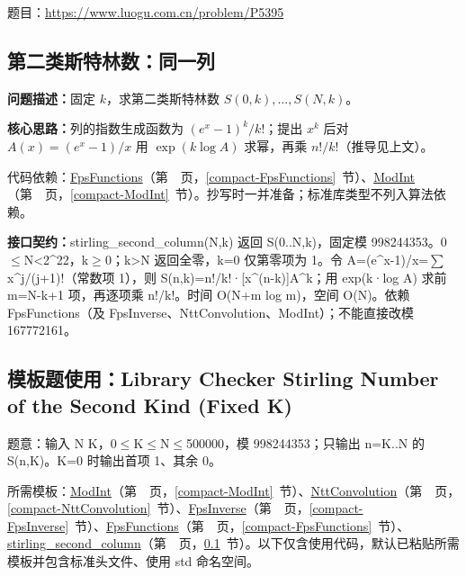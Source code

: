 题目：\url{https://www.luogu.com.cn/problem/P5395}



\Needspace{503pt}

\subsection{第二类斯特林数：同一列}\label{compact-stirling_second_column}

\noindent\textbf{问题描述：}\allowbreak 固定 $k$，求第二类斯特林数 $S(0,k),\dots,S(N,k)$。

\textbf{核心思路：}\allowbreak 列的指数生成函数为 $(e^x-1)^k/k!$；提出 $x^k$ 后对 $A(x)=(e^x-1)/x$ 用 $\exp(k\log A)$ 求幂，再乘 $n!/k!$（推导见上文）。

代码依赖：\hyperref[compact-FpsFunctions]{FpsFunctions}（第~\pageref{compact-FpsFunctions}~页，\ref{compact-FpsFunctions}~节）、\hyperref[compact-ModInt]{ModInt}（第~\pageref{compact-ModInt}~页，\ref{compact-ModInt}~节）。抄写时一并准备；标准库类型不列入算法依赖。

{\sloppy{}\noindent\textbf{接口契约：}stirling\_second\_column(N,k) 返回 S(0..N,k)，固定模 998244353。0$\le$N<2\textasciicircum{}22，k$\ge$0；k>N 返回全零，k=0 仅第零项为 1。令 A=(e\textasciicircum{}x-1)/x=$\sum$x\textasciicircum{}j/(j+1)!（常数项 1），则 S(n,k)=n!/k!·[x\textasciicircum{}(n-k)]A\textasciicircum{}k；用 exp(k·log A) 求前 m=N-k+1 项，再逐项乘 n!/k!。时间 O(N+m log m)，空间 O(N)。依赖 FpsFunctions（及 FpsInverse、NttConvolution、ModInt）；不能直接改模 167772161。\par}



\Needspace{306pt}

\subsection*{模板题使用：Library Checker Stirling Number of the Second Kind (Fixed K)}

\label{usage-example-434}

题意：输入 N K，0$\le$K$\le$N$\le$500000，模 998244353；只输出 n=K..N 的 S(n,K)。K=0 时输出首项 1、其余 0。

所需模板：\hyperref[compact-ModInt]{ModInt}（第~\pageref{compact-ModInt}~页，\ref{compact-ModInt}~节）、\hyperref[compact-NttConvolution]{NttConvolution}（第~\pageref{compact-NttConvolution}~页，\ref{compact-NttConvolution}~节）、\hyperref[compact-FpsInverse]{FpsInverse}（第~\pageref{compact-FpsInverse}~页，\ref{compact-FpsInverse}~节）、\hyperref[compact-FpsFunctions]{FpsFunctions}（第~\pageref{compact-FpsFunctions}~页，\ref{compact-FpsFunctions}~节）、\hyperref[compact-stirling_second_column]{stirling\_\allowbreak{}second\_\allowbreak{}column}（第~\pageref{compact-stirling_second_column}~页，\ref{compact-stirling_second_column}~节）。以下仅含使用代码，默认已粘贴所需模板并包含标准头文件、使用 std 命名空间。

